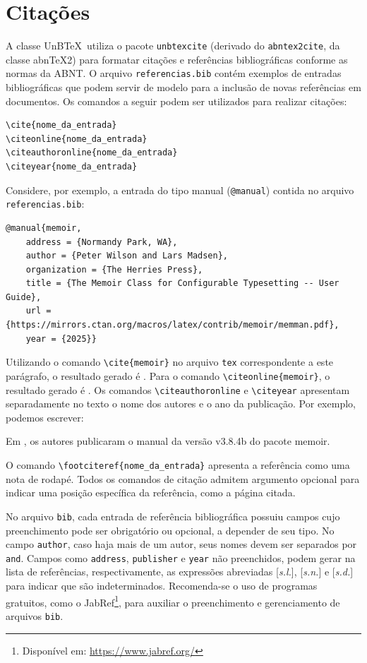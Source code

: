 \chapter{Citações}\label{apd:cit}

A classe UnB\TeX\ utiliza o pacote \texttt{unbtexcite} (derivado do \texttt{abntex2cite}, da classe abn\TeX2) para formatar citações e referências bibliográficas conforme as normas da ABNT. O arquivo \texttt{referencias.bib} contém exemplos de entradas bibliográficas que podem servir de modelo para a inclusão de novas referências em documentos. Os comandos a seguir podem ser utilizados para realizar citações:
\begin{verbatim}
\cite{nome_da_entrada}
\citeonline{nome_da_entrada}
\citeauthoronline{nome_da_entrada}
\citeyear{nome_da_entrada}
\end{verbatim}

Considere, por exemplo, a entrada do tipo manual (\texttt{@manual}) contida no arquivo \texttt{referencias.bib}:
\begin{verbatim}
@manual{memoir,
    address = {Normandy Park, WA},
    author = {Peter Wilson and Lars Madsen},
    organization = {The Herries Press},
    title = {The Memoir Class for Configurable Typesetting -- User Guide},
    url = {https://mirrors.ctan.org/macros/latex/contrib/memoir/memman.pdf},
    year = {2025}}
\end{verbatim}

Utilizando o comando \verb|\cite{memoir}| no arquivo \texttt{tex} correspondente a este parágrafo, o resultado gerado é \cite{memoir}. Para o comando \verb|\citeonline{memoir}|, o resultado gerado é . Os comandos \verb|\citeauthoronline| e \verb|\citeyear| apresentam separadamente no texto o nome dos autores e o ano da publicação. Por exemplo, podemos escrever:
\begin{mdframed}[style=plainSty,innertopmargin=8pt] %
Em \citeyear{memoir}, os autores  publicaram o manual da versão v3.8.4b do pacote \textsf{memoir}.
\end{mdframed}
O comando \verb|\footciteref{nome_da_entrada}| apresenta a referência como uma nota de rodapé. Todos os comandos de citação admitem argumento opcional para indicar uma posição específica da referência, como a página citada.

No arquivo \texttt{bib}, cada entrada de referência bibliográfica possuiu campos cujo preenchimento pode ser obrigatório ou opcional, a depender de seu tipo. No campo \texttt{author}, caso haja mais de um autor, seus nomes devem ser separados por \texttt{and}. Campos como \texttt{address}, \texttt{publisher} e \texttt{year} não preenchidos, podem gerar na lista de referências, respectivamente, as expressões abreviadas [\emph{s.l.}], [\emph{s.n.}] e [\emph{s.d.}] para indicar que são indeterminados. Recomenda-se o uso de programas gratuitos, como o JabRef\footnote{Disponível em: \url{https://www.jabref.org/}}, para auxiliar o preenchimento e gerenciamento de arquivos \texttt{bib}.

